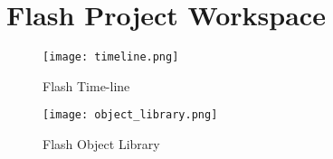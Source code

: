\documentclass[12pt]{report}
\begin{document}
\section{Flash Project Workspace}
\begin{figure}[h]
\begin{center}
\leavevmode
\texttt{[image: timeline.png]}
\end{center}
\caption{Flash Time-line}
\label{fig:samplescreenshots2}
\end{figure}

\begin{figure}[h]
\begin{center}
\leavevmode
\texttt{[image: object\_library.png]}
\end{center}
\caption{Flash Object Library}
\label{fig:samplescreenshots}
\end{figure}
\end{document}
